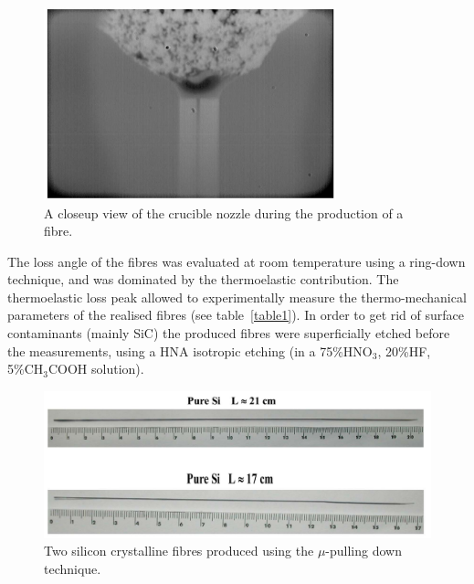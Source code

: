 \begin{figure}[h]
\begin{center}
\includegraphics[width=20pc]{./Sec_Suspensions/Figures/camerasilfib.pdf}\hspace{2pc}%
\caption{A closeup view of the crucible nozzle during the production of a fibre.}\label{camerasilfib.pdf}
\end{center}
\end{figure}


 The loss angle of the fibres was evaluated at room temperature using a ring-down technique, and was dominated by the thermoelastic contribution.
 The thermoelastic loss peak allowed to experimentally measure the
 thermo-mechanical parameters of the realised fibres (see table~\ref{table1}). In order to get rid of surface
 contaminants (mainly SiC) the produced fibres were
 superficially etched before the measurements, using a HNA
 isotropic etching (in a 75\%HNO$_3$, 20\%HF, 5\%CH$_3$COOH
 solution).


\begin{figure}[h]
\begin{center}
\includegraphics[width=28pc]{./Sec_Suspensions/Figures/fibressilfib.pdf}\hspace{2pc}%
\caption{Two silicon crystalline fibres produced using the $\mu$-pulling down technique.}\label{fibressilfib.pdf}
\end{center}
\end{figure}


